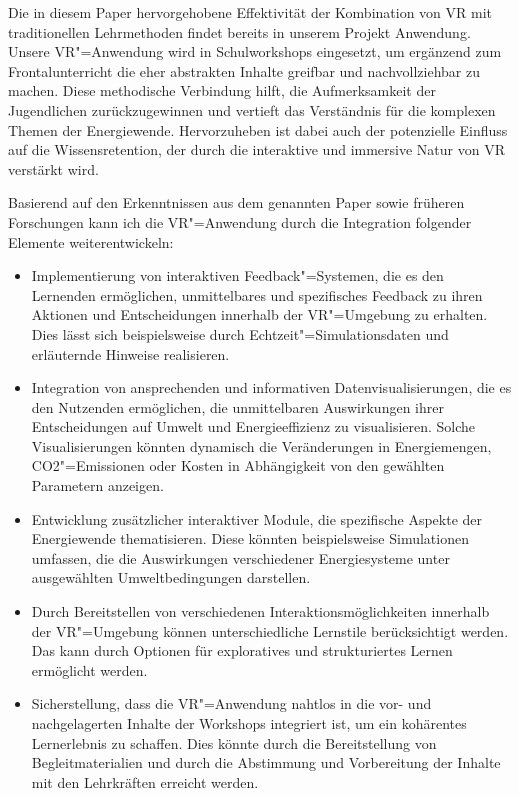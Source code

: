 \documentclass[draft]{vutinfth} %
\begin{document}
Die in diesem Paper hervorgehobene Effektivität der Kombination von VR mit traditionellen Lehrmethoden findet bereits in unserem Projekt Anwendung. Unsere VR"=Anwendung wird in Schulworkshops eingesetzt, um ergänzend zum Frontalunterricht die eher abstrakten Inhalte greifbar und nachvollziehbar zu machen. Diese methodische Verbindung hilft, die Aufmerksamkeit der Jugendlichen zurückzugewinnen und vertieft das Verständnis für die komplexen Themen der Energiewende. Hervorzuheben ist dabei auch der potenzielle Einfluss auf die Wissensretention, der durch die interaktive und immersive Natur von VR verstärkt wird.

Basierend auf den Erkenntnissen aus dem genannten Paper sowie früheren Forschungen kann ich die VR"=Anwendung durch die Integration folgender Elemente weiterentwickeln:

\begin{itemize}

    \item Implementierung von interaktiven Feedback"=Systemen, die es den Lernenden ermöglichen, unmittelbares und spezifisches Feedback zu ihren Aktionen und Entscheidungen innerhalb der VR"=Umgebung zu erhalten. Dies lässt sich beispielsweise durch Echtzeit"=Simulationsdaten und erläuternde Hinweise realisieren.

    \item Integration von ansprechenden und informativen Datenvisualisierungen, die es den Nutzenden ermöglichen, die unmittelbaren Auswirkungen ihrer Entscheidungen auf Umwelt und Energieeffizienz zu visualisieren. Solche Visualisierungen könnten dynamisch die Veränderungen in Energiemengen, CO2"=Emissionen oder Kosten in Abhängigkeit von den gewählten Parametern anzeigen.

    \item Entwicklung zusätzlicher interaktiver Module, die spezifische Aspekte der Energiewende thematisieren. Diese könnten beispielsweise Simulationen umfassen, die die Auswirkungen verschiedener Energiesysteme unter ausgewählten Umweltbedingungen darstellen.

    \item Durch Bereitstellen von verschiedenen Interaktionsmöglichkeiten innerhalb der VR"=Umgebung können unterschiedliche Lernstile berücksichtigt werden. Das kann durch Optionen für exploratives und strukturiertes Lernen ermöglicht werden.

    \item Sicherstellung, dass die VR"=Anwendung nahtlos in die vor- und nachgelagerten Inhalte der Workshops integriert ist, um ein kohärentes Lernerlebnis zu schaffen. Dies könnte durch die Bereitstellung von Begleitmaterialien und durch die Abstimmung und Vorbereitung der Inhalte mit den Lehrkräften erreicht werden.

\end{itemize}
\end{document}

